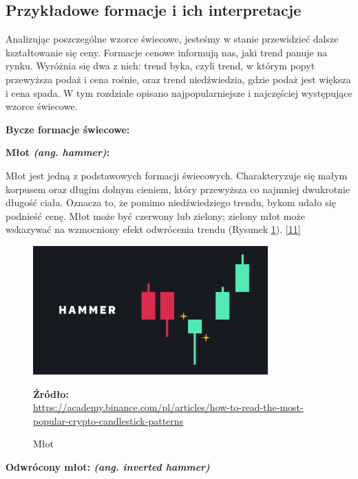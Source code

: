 \documentclass[12pt,a4paper,twoside, inzynierska]{pwr_wmat_praca_dyplomowa}
\theoremstyle{plain}
\numberwithin{theorem}{chapter}
\theoremstyle{definition}
\numberwithin{theorem}{chapter}
\begin{document}
	\subsection{Przykładowe formacje i ich interpretacje}
	Analizując poszczególne wzorce świecowe, jesteśmy w stanie przewidzieć dalsze kształtowanie się ceny. Formacje cenowe informują nas, jaki trend panuje na rynku. Wyróżnia się dwa z nich: trend byka, czyli trend, w którym popyt przewyższa podaż i cena rośnie, oraz trend niedźwiedzia, gdzie podaż jest większa i cena spada. W tym rozdziale opisano najpopularniejsze i najczęściej występujące wzorce świecowe. \newline
	
	\noindent \textbf{Bycze formacje świecowe:}
	\newline
	
	\noindent \textbf{Młot \textit{(ang. hammer)}:}
	
	 Młot jest jedną z podstawowych formacji świecowych. Charakteryzuje się małym korpusem oraz długim dolnym cieniem, który przewyższa co najmniej dwukrotnie długość ciała. Oznacza to, że pomimo niedźwiedziego trendu, bykom udało się podnieść cenę. Młot może być czerwony lub zielony; zielony młot może wskazywać na wzmocniony efekt odwrócenia trendu (Rysunek \ref{fig:hammer}). \hyperref[info11]{[11]}
		\vspace{12pt}
	\begin{figure}[H]
		\centering
		\includegraphics[width=0.5 \textwidth]{hammer.png}
		\caption{Młot}
		\label{fig:hammer}
		\textbf{Źródło:} \\
		\url{https://academy.binance.com/pl/articles/how-to-read-the-most-popular-crypto-candlestick-patterns}
	\end{figure}
	\vspace{12pt}
	
	\noindent \textbf{Odwrócony młot: \textit{(ang. inverted hammer)}}
	
\end{document}
